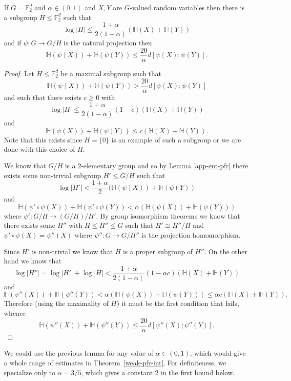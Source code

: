 \begin{lemma}\label{pfr-projection'}\leanok
If $G=\mathbb{F}_2^d$ and $\alpha\in (0,1)$ and $X,Y$ are $G$-valued random
variables then there is a subgroup $H\leq \mathbb{F}_2^d$ such that
\[\log \lvert H\rvert \leq \frac{1+\alpha}{2(1-\alpha)} (\mathbb{H}(X)+\mathbb{H}(Y))\]
and if $\psi:G \to G/H$ is the natural projection then
\[\mathbb{H}(\psi(X))+\mathbb{H}(\psi(Y))\leq \frac{20}{\alpha} d[\psi(X);\psi(Y)].\]
\end{lemma}
\begin{proof}
\leanok
Let $H\leq \mathbb{F}_2^d$ be a maximal subgroup such that
\[\mathbb{H}(\psi(X))+\mathbb{H}(\psi(Y))> \frac{20}{\alpha} d[\psi(X);\psi(Y)]\]
and such that there exists $c \ge 0$ with
\[\log \lvert H\rvert \leq \frac{1+\alpha}{2(1-\alpha)}(1-c)(\mathbb{H}(X)+\mathbb{H}(Y))\]
and
\[\mathbb{H}(\psi(X))+\mathbb{H}(\psi(Y))\leq c (\mathbb{H}(X)+\mathbb{H}(Y)).\]
Note that this exists since $H=\{0\}$ is an example of such a subgroup or we are done with this choice of $H$.

We know that $G/H$ is a $2$-elementary group and so by Lemma
\ref{app-ent-pfr} there exists some non-trivial subgroup $H'\leq G/H$ such
that
\[\log \lvert H'\rvert < \frac{1+\alpha}{2}(\mathbb{H}(\psi(X))+\mathbb{H}(\psi(Y))\]
and
\[\mathbb{H}(\psi' \circ\psi(X))+\mathbb{H}(\psi' \circ \psi(Y))< \alpha(\mathbb{H}(\psi(X))+\mathbb{H}(\psi(Y)))\]
where $\psi':G/H\to (G/H)/H'$. By group isomorphism theorems we know that
there exists some $H''$ with $H\leq H''\leq G$ such that $H'\cong H''/H$ and
$\psi' \circ \psi(X)=\psi''(X)$ where $\psi'':G\to G/H''$ is the projection
homomorphism.

Since $H'$ is non-trivial we know that $H$ is a proper subgroup of $H''$. On the other hand we know that
\[\log \lvert H''\rvert=\log \lvert H'\rvert+\log \lvert H\rvert< \frac{1+\alpha}{2(1-\alpha)}(1-\alpha c)(\mathbb{H}(X)+\mathbb{H}(Y))\]
and
\[\mathbb{H}(\psi''(X))+\mathbb{H}(\psi''(Y))< \alpha (\mathbb{H}(\psi(X))+\mathbb{H}(\psi(Y)))\leq \alpha c (\mathbb{H}(X)+\mathbb{H}(Y)).\]
Therefore (using the maximality of $H$) it must be the first condition that fails, whence
\[\mathbb{H}(\psi''(X))+\mathbb{H}(\psi''(Y))\leq \frac{20}{\alpha}d[\psi''(X);\psi''(Y)].\]
\end{proof}

We could use the previous lemma for any value of $\alpha \in (0,1)$, which
would give a whole range of estimates in Theorem~\ref{weak-pfr-int}. For
definiteness, we specialize only to $\alpha=3/5$, which gives a constant $2$
in the first bound below.

